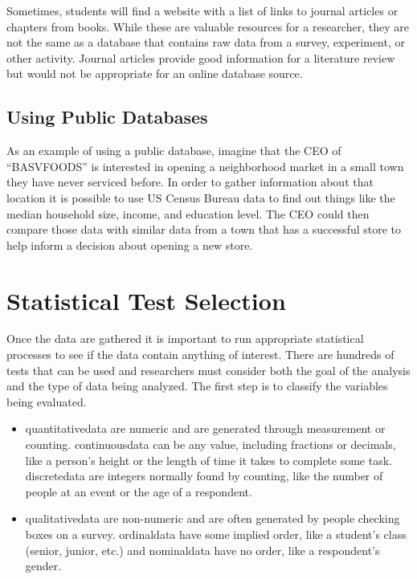 Sometimes, students will find a website with a list of links to journal articles or chapters from books. While these are valuable resources for a researcher, they are not the same as a database that contains raw data from a survey, experiment, or other activity. Journal articles provide good information for a literature review but would not be appropriate for an online database source.

\subsection{Using Public Databases}

As an example of using a public database, imagine that the CEO of ``BASVFOODS'' is interested in opening a neighborhood market in a small town they have never serviced before. In order to gather information about that location it is possible to use US Census Bureau data to find out things like the median household size, income, and education level. The CEO could then compare those data with similar data from a town that has a successful store to help inform a decision about opening a new store.

\section{Statistical Test Selection}

Once the data are gathered it is important to run appropriate statistical processes to see if the data contain anything of interest. There are hundreds of tests that can be used and researchers must consider both the goal of the analysis and the type of data being analyzed. The first step is to classify the variables being evaluated. 

\begin{itemize}
	\item \Gls{quantitativedata} are numeric and are generated through measurement or counting. \Gls{continuousdata} can be any value, including fractions or decimals, like a person's height or the length of time it takes to complete some task. \Gls{discretedata} are integers normally found by counting, like the number of people at an event or the age of a respondent.

	\item \Gls{qualitativedata} are non-numeric and are often generated by people checking boxes on a survey. \Gls{ordinaldata} have some implied order, like a student's class (senior, junior, etc.) and \gls{nominaldata} have no order, like a respondent's gender.
\end{itemize}

